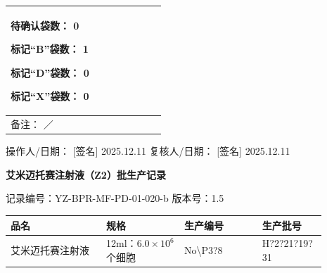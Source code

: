 \documentclass[UTF8,10pt,a4paper,fontset=fandol]{ctexart}
\newcommand{\fieldvalue}[1]{#1}
\newcommand{\handwritten}[1]{#1}
\begin{document}
\begin{tabular}{|p{0.58\linewidth}|p{0.35\linewidth}|}
\begin{minipage}[t]{0.32\linewidth}
待确认袋数：
\fieldvalue{\handwritten{0}}

标记“B”袋数：
\fieldvalue{\handwritten{1}}

标记“D”袋数：
\fieldvalue{\handwritten{0}}

标记“X”袋数：
\fieldvalue{\handwritten{0}}
\end{minipage}
\\
\hline
备注：
\fieldvalue{\handwritten{／}}
&
\\
\hline
\end{tabular}

\vspace{0.5em}

\noindent
操作人/日期：
\fieldvalue{\handwritten{[签名]}}
\quad
\fieldvalue{\handwritten{2025.12.11}}
\hfill
复核人/日期：
\fieldvalue{\handwritten{[签名]}}
\quad
\fieldvalue{\handwritten{2025.12.11}}

\newpage

\begin{center}
\textbf{艾米迈托赛注射液（Z2）批生产记录}
\end{center}

\noindent
记录编号：YZ-BPR-MF-PD-01-020-b \qquad 版本号：1.5

\begin{center}
\begin{tabular}{|p{0.27\linewidth}|p{0.22\linewidth}|p{0.22\linewidth}|p{0.18\linewidth}|}
\hline
品名 & 规格 & 生产编号 & 生产批号 \\
\hline
艾米迈托赛注射液 & 12ml：$6.0\times10^{6}$个细胞 &
\fieldvalue{\handwritten{No\textbackslash P3?8}} &
\fieldvalue{\handwritten{H?2?21?19?31}} \\
\hline
\end{tabular}
\end{center}
\end{document}
